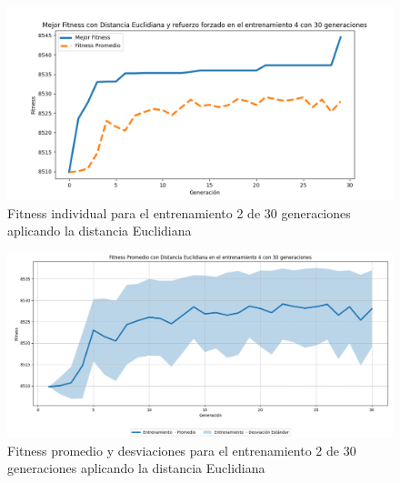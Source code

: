 \documentclass[conference]{IEEEtran}
\begin{document}
\begin{figure}[H]
    \centering
    \includegraphics[width=0.9 \linewidth]{Euclidiana/Fitness_individual_30/Fitness_4_Eucli_30Gen.png}
    \caption{Fitness individual para el entrenamiento 2 de 30 generaciones aplicando la distancia Euclidiana}
    \label{fig:eucli_4_30}
\end{figure}
\begin{figure}[H]
    \centering
    \includegraphics[width=0.9 \linewidth]{Euclidiana/Fitness_individual_30/Fitness_4_Eucli_30Gen_Sombra.png}
    \caption{Fitness promedio y desviaciones para el entrenamiento 2 de 30 generaciones aplicando la distancia Euclidiana}
    \label{fig:eucli_4_30_sombra}
\end{figure}
\end{document}
